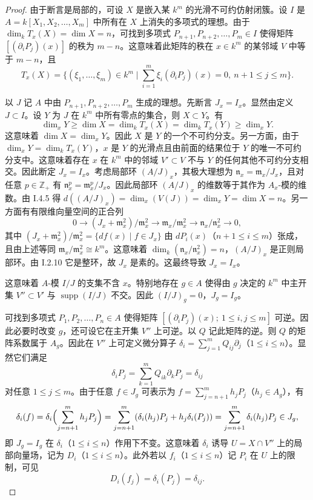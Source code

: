 \begin{proof}
由于断言是局部的，可设 $X$ 是嵌入某 $k^m$ 的光滑不可约仿射闭簇。设 $I$ 是 $A=k[X_1,X_2,\dots,X_m]$ 中所有在 $X$ 上消失的多项式的理想。由于 $\dim_kT_x(X)=\dim X=n$，可找到多项式 $P_{n+1},P_{n+2},\dots,P_m\in I$ 使得矩阵 $[(\partial_iP_j)(x)]$ 的秩为 $m-n$。这意味着此矩阵的秩在 $x\in k^m$ 的某邻域 $V$ 中等于 $m-n$，且
$$T_x(X)=\{(\xi_1,\dots,\xi_m)\in k^m\mid \textstyle\sum_{i=1}^m\xi_i(\partial_iP_j)(x)=0,\ n+1\le j\le m\}.$$

以 $J$ 记 $A$ 中由 $P_{n+1},P_{n+2},\dots,P_m$ 生成的理想。先断言 $J_x=I_x$。显然由定义 $J\subset I$。设 $Y$ 为 $J$ 在 $k^m$ 中所有零点的集合，则 $X\subset Y$。有
$$\dim_xY\ge\dim X=\dim_kT_x(X)=\dim_kT_x(Y)\ge\dim_xY.$$
这意味着 $\dim X=\dim_xY$。因此 $X$ 是 $Y$ 的一个不可约分支。另一方面，由于 $\dim_xY=\dim_kT_x(Y)$，$x$ 是 $Y$ 的光滑点且由前面的结果位于 $Y$ 的唯一不可约分支中。这意味着存在 $x$ 在 $k^m$ 中的邻域 $V'\subset V$ 不与 $Y$ 的任何其他不可约分支相交。因此断定 $J_x=I_x$。考虑局部环 $(A/J)_x$，其极大理想为 $\mathfrak{n}_x=\mathfrak{m}_x/J_x$，且对任意 $p\in\mathbb{Z}_+$ 有 $\mathfrak{n}^p_x=\mathfrak{m}^p_x/J_x$。因此局部环 $(A/J)_x$ 的维数等于其作为 $A_x$-模的维数。由 I.4.5 得 $d((A/J)_x)=\dim_x(V(J))=\dim_xY=\dim X=n$。另一方面有有限维向量空间的正合列
$$0\longrightarrow(J_x+\mathfrak{m}_x^2)/\mathfrak{m}_x^2\longrightarrow\mathfrak{m}_x/\mathfrak{m}_x^2\longrightarrow\mathfrak{n}_x/\mathfrak{n}_x^2\longrightarrow 0,$$
其中 $(J_x+\mathfrak{m}_x^2)/\mathfrak{m}_x^2=\{df(x)\mid f\in J_x\}$ 由 $dP_i(x)$（$n+1\le i\le m$）张成，且由上述等同 $\mathfrak{m}_x/\mathfrak{m}_x^2\cong k^m$。这意味着 $\dim_k(\mathfrak{n}_x/\mathfrak{n}_x^2)=n$，$(A/J)_x$ 是正则局部环。由 I.2.10 它是整环，故 $J_x$ 是素的。这最终导致 $J_x=I_x$。

这意味着 $A$-模 $I/J$ 的支集不含 $x$。特别地存在 $g\in A$ 使得由 $g$ 决定的 $k^m$ 中主开集 $V''\subset V'$ 与 $\operatorname{supp}(I/J)$ 不交。因此 $(I/J)_g=0$，$J_g=I_g$。

可找到多项式 $P_1,P_2,\dots,P_n\in A$ 使得矩阵 $[(\partial_iP_j)(x);\ 1\le i,j\le m]$ 可逆。因此必要时改变 $g$，还可设它在主开集 $V''$ 上可逆。以 $Q$ 记此矩阵的逆。则 $Q$ 的矩阵系数属于 $A_g$。因此在 $V''$ 上可定义微分算子 $\delta_i=\sum_{j=1}^mQ_{ij}\partial_j$（$1\le i\le n$）。显然它们满足
$$\delta_iP_j=\sum_{k=1}^mQ_{ik}\partial_kP_j=\delta_{ij}$$
对任意 $1\le j\le m$。由于任意 $f\in J_g$ 可表示为 $f=\sum_{j=n+1}^m h_jP_j$（$h_j\in A_g$），有
$$\delta_i(f)=\delta_i\Bigl(\sum_{j=n+1}^m h_jP_j\Bigr)=\sum_{j=n+1}^m(\delta_i(h_j)P_j+h_j\delta_i(P_j))=\sum_{j=n+1}^m\delta_i(h_j)P_j\in J_g,$$
即 $J_g=I_g$ 在 $\delta_i$（$1\le i\le n$）作用下不变。这意味着 $\delta_i$ 诱导 $U=X\cap V''$ 上的局部向量场，记为 $D_i$（$1\le i\le n$）。此外若以 $f_i$（$1\le i\le n$）记 $P_i$ 在 $U$ 上的限制，可见
$$D_i(f_j)=\delta_i(P_j)=\delta_{ij}.$$
\end{proof}

